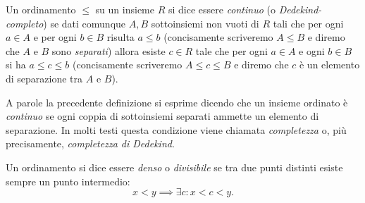 \begin{definition}
  \label{def:ordinamento_continuo}%
  Un ordinamento $\le$ su un insieme $R$ si dice essere
  \emph{continuo}%
%
  (o \emph{Dedekind-completo})
  se dati comunque $A,B$ sottoinsiemi non vuoti di $R$
    tali che per ogni $a\in A$ e per ogni $b\in B$ risulta $a\le b$
    (concisamente scriveremo $A\le B$ e diremo che $A$ e $B$ sono 
    \emph{separati})
    allora esiste $c\in R$ tale che per ogni $a\in A$ e ogni $b\in B$ 
    si ha $a\le c \le b$ (concisamente scriveremo $A\le c \le B$
    e diremo che $c$ è un elemento di separazione tra $A$ e $B$).
\end{definition}

A parole la precedente definizione si esprime dicendo che un insieme ordinato
è \emph{continuo} se ogni coppia di sottoinsiemi separati 
ammette un elemento di separazione.
In molti testi questa condizione viene chiamata \emph{completezza}
o, più precisamente, \emph{completezza di Dedekind}.
%
%

\begin{definition}
  \label{def:ordinamento_denso}%
  Un ordinamento si dice essere
  \emph{denso}%
%
 o \emph{divisibile} 
  se tra due punti distinti esiste sempre un punto intermedio:
  \[
   x < y \implies \exists c \colon x < c < y.
  \]
\end{definition}

